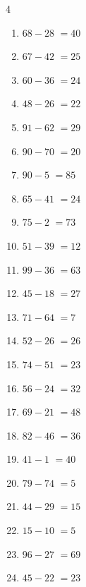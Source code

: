 \begin{multicols}{4}
\begin{enumerate}
  \item $68-28$
        $=40$

  \item $67-42$
        $=25$

  \item $60-36$
        $=24$

  \item $48-26$
        $=22$

  \item $91-62$
        $=29$

  \item $90-70$
        $=20$

  \item $90-5$
        $=85$

  \item $65-41$
        $=24$

  \item $75-2$
        $=73$

  \item $51-39$
        $=12$

  \item $99-36$
        $=63$

  \item $45-18$
        $=27$

  \item $71-64$
        $=7$

  \item $52-26$
        $=26$

  \item $74-51$
        $=23$

  \item $56-24$
        $=32$

  \item $69-21$
        $=48$

  \item $82-46$
        $=36$

  \item $41-1$
        $=40$

  \item $79-74$
        $=5$

  \item $44-29$
        $=15$

  \item $15-10$
        $=5$

  \item $96-27$
        $=69$

  \item $45-22$
        $=23$


\end{enumerate}
\end{multicols}
